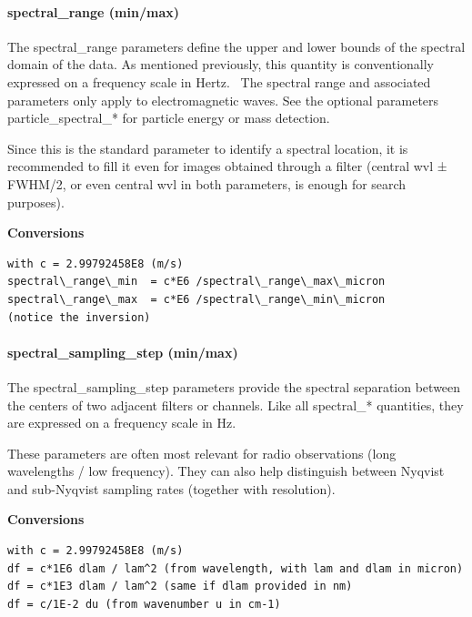 \documentclass[11pt,a4paper]{ivoa}
\begin{document}
\paragraph{spectral\_range (min/max)}

The spectral\_range parameters define the upper and lower bounds of the spectral domain of the data. As mentioned previously, this quantity is conventionally expressed on a frequency scale in Hertz.  The spectral range and associated parameters only apply to electromagnetic waves. See the optional parameters particle\_spectral\_* for particle energy or mass detection.

Since this is the standard parameter to identify a spectral location, it is recommended to fill it even for images obtained through a filter (central wvl ± FWHM/2, or even central wvl in both parameters, is enough for search purposes). 





\textbf{Conversions}




\begin{verbatim}with c = 2.99792458E8 (m/s)
spectral\_range\_min  = c*E6 /spectral\_range\_max\_micron
spectral\_range\_max  = c*E6 /spectral\_range\_min\_micron
(notice the inversion)\end{verbatim}




\paragraph{spectral\_sampling\_step (min/max)}

The spectral\_sampling\_step parameters provide the spectral separation between the centers of two adjacent filters or channels. Like all spectral\_* quantities, they are expressed on a frequency scale in Hz. 

These parameters are often most relevant for radio observations (long wavelengths / low frequency). They can also help distinguish between Nyqvist and sub-Nyqvist sampling rates (together with resolution).





\textbf{Conversions}




\begin{verbatim}with c = 2.99792458E8 (m/s)
df = c*1E6 dlam / lam^2 (from wavelength, with lam and dlam in micron)
df = c*1E3 dlam / lam^2 (same if dlam provided in nm)
df = c/1E-2 du (from wavenumber u in cm-1)\end{verbatim}
\end{document}
